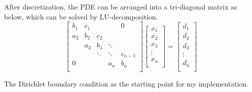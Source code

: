 \documentclass{beamer}
\begin{document}
\begin{frame}
After discretization, the PDE can be arranged into a tri-diagonal matrix as below, which can be solved by LU-decomposition. \newline
$$
\begin{bmatrix}
   {b_1} &  {c_1} & {   } & {   } & { 0 } \\
   {a_2} &  {b_2} & {c_2} & {   } & {   } \\
   {   } &  {a_3} & {b_3} & \ddots & {   } \\
   {   } &  {   } & \ddots & \ddots & {c_{n-1}}\\
   { 0 } &  {   } & {   } & {a_n} & {b_n}\\
\end{bmatrix}
\begin{bmatrix}
   {x_1 }  \\
   {x_2 }  \\
   {x_3 }  \\
   \vdots   \\
   {x_n }  \\
\end{bmatrix}
=
\begin{bmatrix}
   {d_1 }  \\
   {d_2 }  \\
   {d_3 }  \\
   \vdots   \\
   {d_n }  \\
\end{bmatrix}
$$

The Dirichlet boundary condition as the starting point for my implementation.
\end{frame}
\end{document}
